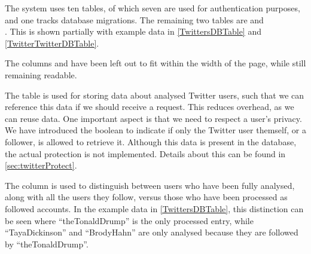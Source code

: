 The system uses ten tables, of which seven are used for authentication purposes,
and one tracks database migrations. The remaining two tables are
 and \\. This is shown partially with
example data in \autoref{TwittersDBTable} and \autoref{TwitterTwitterDBTable}.\nl

The columns  and  have been left out to
fit within the width of the page, while still remaining readable.

\begin{table}[H]
\centering
{}
\caption{ table containing Twitter users and their determined
values.}
\label{TwittersDBTable}
\end{table}

The table  is used for storing data about analysed Twitter
users, such that we can reference this data if we should receive a request. This
reduces overhead, as we can reuse data. One important aspect is that we need to
respect a user's privacy. We have introduced the 
boolean to indicate if only the Twitter user themself, or a follower, is allowed
to retrieve it. Although this data is present in the database, the actual 
protection is not implemented. Details about this can be found in
\autoref{sec:twitterProtect}.\nl

The  column is used to distinguish between users who have been
fully analysed, along with all the users they follow, versus those who have been
processed as followed accounts. In the example data in
\autoref{TwittersDBTable}, this distinction can be seen where ``theTonaldDrump''
is the only processed entry, while ``TayaDickinson'' and ``BrodyHahn''
are only analysed because they are followed by ``theTonaldDrump''.


